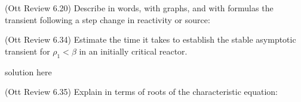 \documentclass[11pt,addpoints]{exam}
\begin{document}
\begin{questions}
        \question (Ott Review 6.20) Describe in words, with graphs, and with 
        formulas the transient following a step change in reactivity or source:

        \question (Ott Review 6.34) Estimate the time it takes to establish the 
        stable asymptotic transient for $\rho_1 < \beta$ in an initially 
        critical reactor.
                \begin{solution}
                        solution here
                \end{solution}


        \question[10] (Ott Review 6.35) Explain in terms of roots of the 
        characteristic equation:
\end{questions}
\end{document}
